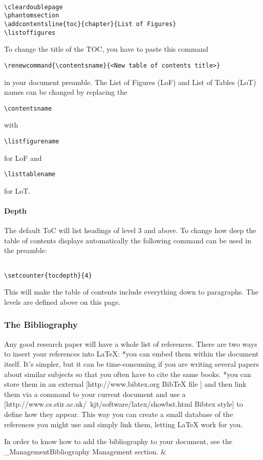 \begin{lstlisting}

\cleardoublepage
\phantomsection
\addcontentsline{toc}{chapter}{List of Figures}
\listoffigures

\end{lstlisting}


To change the title of the TOC, you have to paste this command \begin{lstlisting}
\renewcommand{\contentsname}{<New table of contents title>}
\end{lstlisting}
 in your document preamble.  The List of Figures (LoF) and List of Tables (LoT) names can be changed by replacing the \begin{lstlisting}
\contentsname
\end{lstlisting}
 with \begin{lstlisting}
\listfigurename
\end{lstlisting}
 for LoF and \begin{lstlisting}
\listtablename
\end{lstlisting}
 for LoT.

\paragraph{ Depth }
The default ToC will list headings of level 3 and above.  To change how deep the table of contents displays automatically the following command can be used in the preamble:

\begin{lstlisting}

\setcounter{tocdepth}{4}

\end{lstlisting}


This will make the table of contents include everything down to paragraphs.   The levels are defined above on this page.

\subsubsection{ The Bibliography }

Any good research paper will have a whole list of references. There are two ways to insert your references into LaTeX: 
*you can embed them within the document itself. It's simpler, but it can be time-consuming if you are writing several papers about similar subjects so that you often have to cite the same books.
*you can store them in an external [http://www.bibtex.org BibTeX file ] and then link them via a command to your current document and use a [http://www.cs.stir.ac.uk/~kjt/software/latex/showbst.html Bibtex style] to define how they appear. This way you can create a small database of the references you might use and simply link them, letting LaTeX work for you.

In order to know how to add the bibliography to your document, see the \_ManagementBibliography Management section. &
